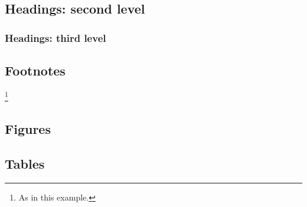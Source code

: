 \documentclass{article}
\begin{document}
\subsection{Headings: second level}
\subsubsection{Headings: third level}



\subsection{Footnotes}

\footnote{As in this example.}

\subsection{Figures}



\subsection{Tables}



\end{document}
